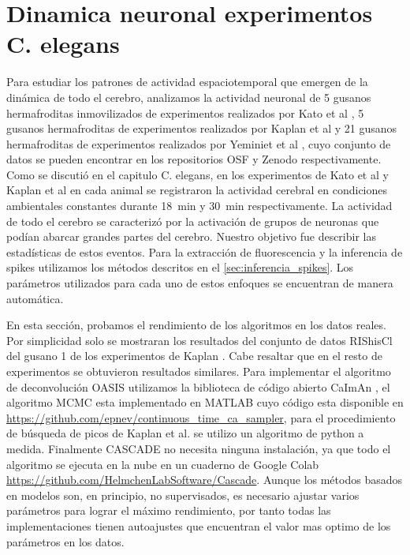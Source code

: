 \section{Dinamica neuronal experimentos C. elegans}\label{sec:umbralizacion}

 Para estudiar los patrones de actividad espaciotemporal que emergen de la dinámica de todo el cerebro, analizamos la actividad neuronal de 5 gusanos hermafroditas inmovilizados  de experimentos realizados por Kato et al \cite{kato_global_2015},   5 gusanos hermafroditas de experimentos realizados por Kaplan et al \cite{kaplan_nested_2020} y 21 gusanos hermafroditas de experimentos realizados por Yeminiet et al \cite{yemini_neuropal_2021}, cuyo  conjunto de datos se pueden encontrar en los repositorios OSF \cite{Zimmer_2022,Zimmer_20222} y  Zenodo \cite{eviatar_yemini_2020_3906530} respectivamente.  Como se discutió en el capitulo C. elegans,   en los experimentos de Kato et al y Kaplan et al  en cada animal se registraron la actividad cerebral en condiciones ambientales constantes durante \qty{18}{\minute } y \qty{30}{\minute}  respectivamente. La actividad de todo el cerebro se caracterizó por la activación de grupos de neuronas  que podían abarcar grandes partes del cerebro. Nuestro objetivo fue describir las estadísticas de estos eventos.  Para la extracción de fluorescencia y la inferencia de spikes utilizamos los métodos descritos en el \cref{sec:inferencia_spikes}.  Los parámetros utilizados para cada uno de estos enfoques  se encuentran de manera automática.  
 
 
 En esta sección, probamos el rendimiento de los algoritmos en los datos reales. Por simplicidad solo se mostraran los resultados del conjunto de datos RIShisCl  del gusano 1 de los experimentos de Kaplan \cite{Zimmer_20222}. Cabe resaltar que en el resto de experimentos se obtuvieron  resultados similares.  Para implementar el algoritmo de deconvolución  OASIS utilizamos la biblioteca de código abierto CaImAn \cite{giovannucci_caiman_2019}, el algoritmo MCMC esta implementado en MATLAB cuyo código esta disponible en \url{https://github.com/epnev/continuous_time_ca_sampler}, para el procedimiento de búsqueda de picos de Kaplan et al. se utilizo un algoritmo de python a medida.   Finalmente CASCADE no necesita  ninguna instalación, ya que todo el algoritmo se ejecuta en la nube en un cuaderno de Google Colab \url{https://github.com/HelmchenLabSoftware/Cascade}.    Aunque los métodos basados en modelos son, en principio, no supervisados, es necesario ajustar varios parámetros para lograr el máximo rendimiento, por tanto todas las implementaciones tienen autoajustes que encuentran el valor mas optimo de los parámetros en los datos.
 
